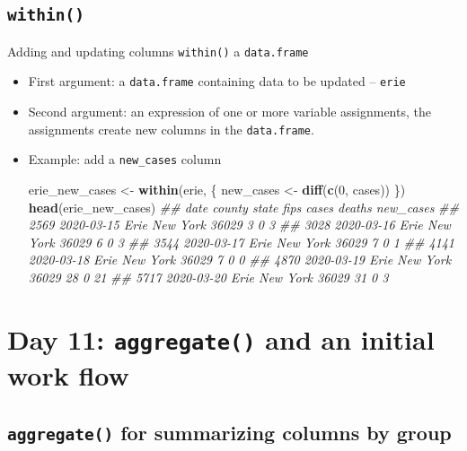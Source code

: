 \documentclass[
]{book}
\newenvironment{Shaded}{\begin{snugshade}}{\end{snugshade}}
\newcommand{\CommentTok}[1]{\textcolor[rgb]{0.56,0.35,0.01}{\textit{#1}}}
\newcommand{\DecValTok}[1]{\textcolor[rgb]{0.00,0.00,0.81}{#1}}
\newcommand{\KeywordTok}[1]{\textcolor[rgb]{0.13,0.29,0.53}{\textbf{#1}}}
\newcommand{\NormalTok}[1]{#1}
\newcommand{\StringTok}[1]{\textcolor[rgb]{0.31,0.60,0.02}{#1}}
\begin{document}
\hypertarget{within}{%
\subsection*{\texorpdfstring{\texttt{within()}}{within()}}\label{within}}

Adding and updating columns \texttt{within()} a \texttt{data.frame}

\begin{itemize}
\item
  First argument: a \texttt{data.frame} containing data to be updated -- \texttt{erie}
\item
  Second argument: an expression of one or more variable assignments, the assignments create new columns in the \texttt{data.frame}.
\item
  Example: add a \texttt{new\_cases} column

\begin{Shaded}
\begin{Highlighting}[]
\NormalTok{erie_new_cases <-}\StringTok{ }\KeywordTok{within}\NormalTok{(erie, \{}
\NormalTok{    new_cases <-}\StringTok{ }\KeywordTok{diff}\NormalTok{(}\KeywordTok{c}\NormalTok{(}\DecValTok{0}\NormalTok{, cases))}
\NormalTok{\})}
\KeywordTok{head}\NormalTok{(erie_new_cases)}
\CommentTok{##            date county    state  fips cases deaths new_cases}
\CommentTok{## 2569 2020-03-15   Erie New York 36029     3      0         3}
\CommentTok{## 3028 2020-03-16   Erie New York 36029     6      0         3}
\CommentTok{## 3544 2020-03-17   Erie New York 36029     7      0         1}
\CommentTok{## 4141 2020-03-18   Erie New York 36029     7      0         0}
\CommentTok{## 4870 2020-03-19   Erie New York 36029    28      0        21}
\CommentTok{## 5717 2020-03-20   Erie New York 36029    31      0         3}
\end{Highlighting}
\end{Shaded}
\end{itemize}

\hypertarget{day-11-aggregate-and-an-initial-work-flow}{%
\section{\texorpdfstring{Day 11: \texttt{aggregate()} and an initial work flow}{Day 11: aggregate() and an initial work flow}}\label{day-11-aggregate-and-an-initial-work-flow}}

\hypertarget{aggregate-for-summarizing-columns-by-group}{%
\subsection*{\texorpdfstring{\texttt{aggregate()} for summarizing columns by group}{aggregate() for summarizing columns by group}}\label{aggregate-for-summarizing-columns-by-group}}
\end{document}

